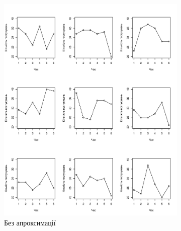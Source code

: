 \begin{figure}[h]
  \centering
  \begin{subfigure}[b]{0.45\textwidth}
    \includegraphics[width=\textwidth]{code/example_2.png}
    \caption{Без апроксимації}
    \label{fig:tapping:poisson}
  \end{subfigure}
  \begin{subfigure}[b]{0.45\textwidth}

\end{subfigure}
\end{figure}
